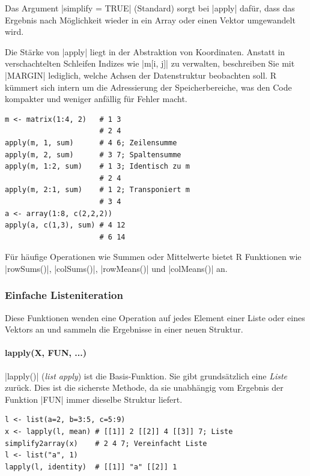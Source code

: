 \documentclass[10pt,twocolumn]{scrartcl}
\renewcommand{\lstinline}{\mycoloredinline}
\begin{document}
Das Argument \lstinline|simplify = TRUE| (Standard) sorgt bei \lstinline|apply| dafür, dass das Ergebnis nach Möglichkeit wieder in ein Array oder einen Vektor umgewandelt wird.

Die Stärke von \lstinline|apply| liegt in der Abstraktion von Koordinaten. Anstatt in verschachtelten Schleifen Indizes wie \lstinline|m[i, j]| zu verwalten, beschreiben Sie mit \lstinline|MARGIN| lediglich, welche Achsen der Datenstruktur beobachten soll. R kümmert sich intern um die Adressierung der Speicherbereiche, was den Code kompakter und weniger anfällig für Fehler macht.

\begin{lstlisting}
m <- matrix(1:4, 2)   # 1 3
                      # 2 4 
apply(m, 1, sum)      # 4 6; Zeilensumme
apply(m, 2, sum)      # 3 7; Spaltensumme
apply(m, 1:2, sum)    # 1 3; Identisch zu m
                      # 2 4
apply(m, 2:1, sum)    # 1 2; Transponiert m
                      # 3 4
a <- array(1:8, c(2,2,2))
apply(a, c(1,3), sum) # 4 12
                      # 6 14
\end{lstlisting}

Für häufige Operationen wie Summen oder Mittelwerte bietet R Funktionen wie \lstinline|rowSums()|, \lstinline|colSums()|, \lstinline|rowMeans()| und \lstinline|colMeans()| an.


\subsubsection{Einfache Listeniteration}

Diese Funktionen wenden eine Operation auf jedes Element einer Liste oder eines Vektors an und sammeln die Ergebnisse in einer neuen Struktur.

\paragraph{lapply(X, FUN, ...)}

\lstinline|lapply()| (\emph{list apply}) ist die Basis-Funktion. Sie gibt grundsätzlich eine \emph{Liste} zurück. Dies ist die sicherste Methode, da sie unabhängig vom Ergebnis der Funktion \lstinline|FUN| immer dieselbe Struktur liefert.

\begin{lstlisting}
l <- list(a=2, b=3:5, c=5:9)
x <- lapply(l, mean) # [[1]] 2 [[2]] 4 [[3]] 7; Liste
simplify2array(x)    # 2 4 7; Vereinfacht Liste
l <- list("a", 1)
lapply(l, identity)  # [[1]] "a" [[2]] 1
\end{lstlisting}
\end{document}
